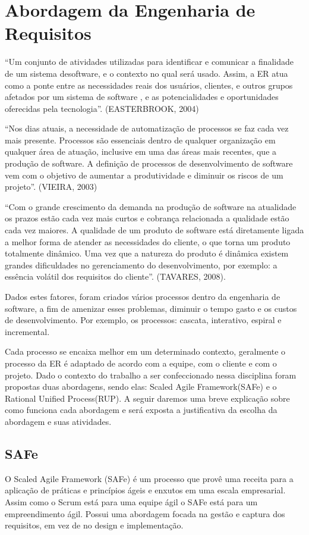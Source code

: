\chapter[Abordagem da Engenharia de Requisitos]{Abordagem da Engenharia de Requisitos}
“Um conjunto de atividades utilizadas para identificar e comunicar a finalidade de um sistema desoftware, e o contexto no qual será usado. Assim, a ER atua como a ponte entre as necessidades reais dos usuários, clientes, e outros grupos afetados por um sistema de software , e as potencialidades e oportunidades oferecidas pela tecnologia”. (EASTERBROOK, 2004)

“Nos dias atuais, a necessidade de automatização de processos se faz cada vez mais presente. Processos são essenciais dentro de qualquer organização em qualquer área de atuação, inclusive em uma das áreas mais recentes, que a produção de software. A definição de processos de desenvolvimento de software vem com o objetivo de aumentar a produtividade e diminuir os riscos de um projeto”. (VIEIRA, 2003)

“Com o grande crescimento da demanda na produção de software na atualidade os prazos estão cada vez mais curtos e cobrança relacionada a qualidade estão cada vez maiores. A qualidade de um produto de software está diretamente ligada a melhor forma de atender as necessidades do cliente, o que torna um produto totalmente dinâmico. Uma vez que a natureza do produto é dinâmica existem grandes dificuldades no gerenciamento do desenvolvimento, por exemplo: a essência volátil dos requisitos do cliente”. (TAVARES, 2008).

Dados estes fatores, foram criados vários processos dentro da engenharia de software, a fim de amenizar esses problemas, diminuir o tempo gasto e os custos de desenvolvimento. Por exemplo, os processos: cascata, interativo, espiral e incremental.

Cada processo se encaixa melhor em um determinado contexto, geralmente o processo da ER é adaptado de acordo com a equipe, com o cliente e com o projeto. Dado o contexto do trabalho a ser confeccionado nessa disciplina foram propostas duas abordagens, sendo elas: Scaled Agile Framework(SAFe) e o Rational Unified Process(RUP). A seguir daremos uma breve explicação sobre como funciona cada abordagem e será exposta a justificativa da escolha da abordagem e suas atividades.
  \section{SAFe}
O Scaled Agile Framework (SAFe) é um processo que provê uma receita para a aplicação de práticas e princípios ágeis e enxutos em uma escala empresarial. Assim como o Scrum está para uma equipe ágil o SAFe está para um empreendimento ágil. Possui uma abordagem focada na gestão e captura dos requisitos, em vez de no design e implementação.

